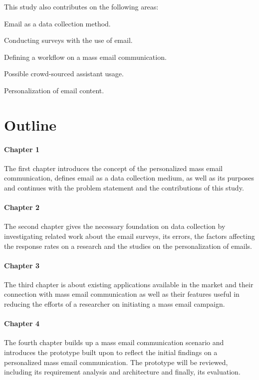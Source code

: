 This study also contributes on the following areas:

\begin{compactenum}
	\item Email as a data collection method.
	\item Conducting surveys with the use of email.
	\item Defining a workflow on a mass email communication.
	\item Possible crowd-sourced assistant usage.
	\item Personalization of email content.
\end{compactenum}

\section{Outline}
\label{sec:3:Outline}

\paragraph{Chapter 1} The first chapter introduces the concept of the personalized mass email communication, defines email as a data collection medium, as well as its purposes and continues with the problem statement and the contributions of this study.
  
\paragraph{Chapter 2} The second chapter gives the necessary foundation on data collection by investigating related work about the email surveys, its errors, the factors affecting the response rates on a research and the studies on the personalization of emails.

\paragraph{Chapter 3} The third chapter is about existing applications available in the market and their connection with mass email communication as well as their features useful in reducing the efforts of a researcher on initiating a mass email campaign.

\paragraph{Chapter 4} The fourth chapter builds up a mass email communication scenario and introduces the prototype built upon to reflect the initial findings on a personalized mass email communication. The prototype will be reviewed, including its requirement analysis and architecture and finally, its evaluation.

